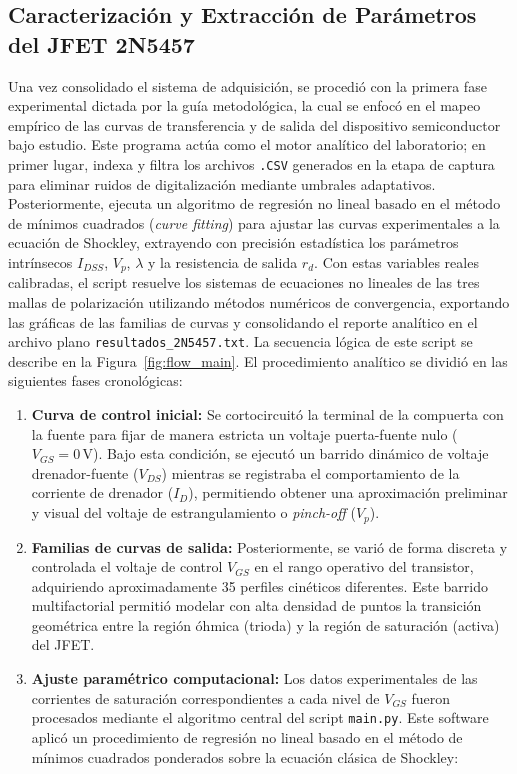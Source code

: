 \documentclass[conference]{IEEEtran}
\begin{document}
\subsection{Caracterización y Extracción de Parámetros del JFET 2N5457}
Una vez consolidado el sistema de adquisición, se procedió con la primera fase
experimental dictada por la guía metodológica, la cual se enfocó en el mapeo
empírico de las curvas de transferencia y de salida del dispositivo
semiconductor bajo estudio. Este programa actúa como el motor analítico del
laboratorio; en primer lugar, indexa y filtra los archivos \texttt{.CSV}
generados en la etapa de captura para eliminar ruidos de digitalización
mediante umbrales adaptativos. Posteriormente, ejecuta un algoritmo de
regresión no lineal basado en el método de mínimos cuadrados (\textit{curve
    fitting}) para ajustar las curvas experimentales a la ecuación de Shockley,
extrayendo con precisión estadística los parámetros intrínsecos $I_{DSS}$,
$V_p$, $\lambda$ y la resistencia de salida $r_d$. Con estas variables reales
calibradas, el script resuelve los sistemas de ecuaciones no lineales de las
tres mallas de polarización utilizando métodos numéricos de convergencia,
exportando las gráficas de las familias de curvas y consolidando el reporte
analítico en el archivo plano \texttt{resultados\_2N5457.txt}. La secuencia
lógica de este script se describe en la Figura~\ref{fig:flow_main}. El
procedimiento analítico se dividió en las siguientes fases cronológicas:
\begin{enumerate}
    \item \textbf{Curva de control inicial:} Se cortocircuitó la terminal de la compuerta con la fuente para fijar de manera estricta un voltaje puerta-fuente nulo ($V_{GS} = 0\,\text{V}$). Bajo esta condición, se ejecutó un barrido dinámico de voltaje drenador-fuente ($V_{DS}$) mientras se registraba el comportamiento de la corriente de drenador ($I_D$), permitiendo obtener una aproximación preliminar y visual del voltaje de estrangulamiento o \textit{pinch-off} ($V_p$).
    \item \textbf{Familias de curvas de salida:} Posteriormente, se varió de forma discreta y controlada el voltaje de control $V_{GS}$ en el rango operativo del transistor, adquiriendo aproximadamente 35 perfiles cinéticos diferentes. Este barrido multifactorial permitió modelar con alta densidad de puntos la transición geométrica entre la región óhmica (trioda) y la región de saturación (activa) del JFET\@.
    \item \textbf{Ajuste paramétrico computacional:} Los datos experimentales de las corrientes de saturación correspondientes a cada nivel de $V_{GS}$ fueron procesados mediante el algoritmo central del script \texttt{main.py}. Este software aplicó un procedimiento de regresión no lineal basado en el método de mínimos cuadrados ponderados sobre la ecuación clásica de Shockley:
\end{enumerate}
\end{document}
